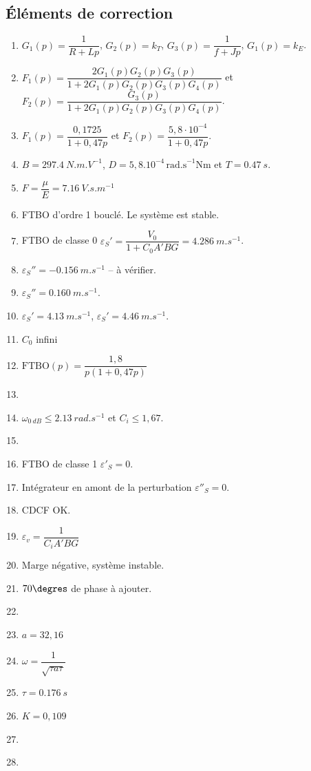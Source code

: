 \documentclass[10pt,fleqn]{article} %
\begin{document}
\begin{multicols}{2}
\subsection*{Éléments de correction}
\footnotesize{
\begin{enumerate}
\item $G_1(p)=\dfrac{1}{R+Lp}$, $G_2(p)=k_T$, $G_3(p)=\dfrac{1}{f+Jp}$, $G_1(p)=k_E$. 
\item $F_1(p)=\dfrac{2G_1(p)G_2(p)G_3(p)}{1+2G_1(p)G_2(p)G_3(p)G_4(p)}$ et  
$F_2(p)=\dfrac{G_3(p)}{1+2G_1(p)G_2(p)G_3(p)G_4(p)}$.
\item $F_1(p)=\dfrac{0,1725}{1+0,47p}$ et $F_2(p)=\dfrac{5,8 \cdot 10^{-4}}{1+0,47p}$.
\item $B=\SI{297,4}{N.m.V^{-1}}$, $D=5,8.10^{-4}\,\text{rad.s}^{-1}\text{Nm}$ et $T=\SI{0,47}{s}$.
\item $F=\dfrac{\mu}{E}=\SI{7,16}{V.s.m^{-1}}$
\item FTBO d'ordre 1 bouclé. Le système est stable.
\item  FTBO de classe 0 $\varepsilon_S'=\dfrac{V_0}{1+C_0A'BG}=\SI{4,286}{m.s^{-1}}$.
\item $\varepsilon_S''=\SI{-0,156}{m.s^{-1}}$ -- à vérifier.
\item $\varepsilon_S''=\SI{0,160}{m.s^{-1}}$.
\item $\varepsilon_S'=\SI{4,13}{m.s^{-1}}$, $\varepsilon_S'=\SI{4,46}{m.s^{-1}}$.
\item $C_0$ infini
\item $\text{FTBO}(p)=\dfrac{1,8}{p\left(1+0,47 p \right)}$
\item $\quad$
\item $\omega_{\SI{0}{dB}}\leq\SI{2,13}{rad.s^{-1}}$ et $C_i\leq1,67$.
\item $\quad$
\item FTBO de classe 1 $\varepsilon'_S=0$.
\item Intégrateur en amont de la perturbation $\varepsilon''_S=0$.
\item CDCF OK.
\item $\varepsilon_v=\dfrac{1}{C_iA'BG}$
\item Marge négative, système instable.
\item $70\degres$ de phase à ajouter.
\item $\quad$
\item $a=32,16$
\item $\omega=\dfrac{1}{\sqrt{\tau a \tau}}$
\item $\tau = \SI{0,176}{s}$
\item $K=0,109$
\item $\quad$
\item $\quad$
\end{enumerate}}


\end{multicols}
\end{document}
